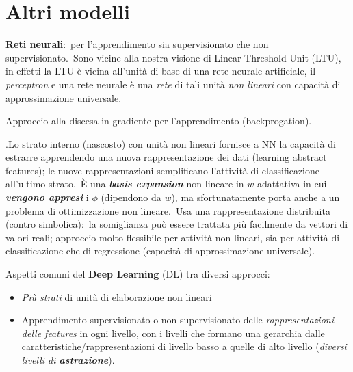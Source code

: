 \section{Altri modelli}
\textbf{Reti neurali}:\ per l'apprendimento sia supervisionato che non supervisionato.\
Sono vicine alla nostra visione di Linear Threshold Unit (LTU), in effetti la LTU è vicina all'unità di base di una rete neurale artificiale, il \textit{perceptron} e una rete neurale è una \textit{rete} di tali unità \textit{non lineari} con capacità di approssimazione universale.\

Approccio alla discesa in gradiente per l'apprendimento (backprogation).
\vspace{12pt}

.\noindent Lo strato interno (nascosto) con unità non lineari fornisce a NN la capacità di estrarre apprendendo una nuova rappresentazione dei dati (learning abstract features); le nuove rappresentazioni semplificano l'attività di classificazione all'ultimo strato.\
È una \textbf{\textit{basis expansion}} non lineare in $w$ adattativa in cui \textbf{\textit{vengono appresi}} i $\phi$ (dipendono da $w$), ma sfortunatamente porta anche a un problema di ottimizzazione non lineare.\
Usa una rappresentazione distribuita (contro simbolica):\ la somiglianza può essere trattata più facilmente da vettori di valori reali; approccio molto flessibile per attività non lineari, sia per attività di classificazione che di regressione (capacità di approssimazione universale).\
\vspace{12pt}

\noindent Aspetti comuni del \textbf{Deep Learning} (DL) tra diversi approcci:
\begin{itemize}
	\item \textit{Più strati} di unità di elaborazione non lineari
	\item Apprendimento supervisionato o non supervisionato delle \textit{rappresentazioni delle features} in ogni livello, con i livelli che formano una gerarchia dalle caratteristiche/rappresentazioni di livello basso a quelle di alto livello (\textit{diversi livelli di \textbf{astrazione}}).
\end{itemize}
